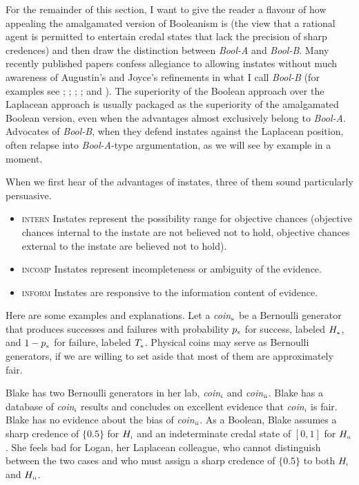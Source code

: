 \documentclass[11pt]{article}
\newcommand{\anderson}[0]{\textit{Bool-A}}
\newcommand{\augustin}[0]{\textit{Bool-B}}
\begin{document}
For the remainder of this section, I want to give the reader a flavour
of how appealing the amalgamated version of Booleanism is (the view
that a rational agent is permitted to entertain credal states that
lack the precision of sharp credences) and then draw the distinction
between {\anderson} and {\augustin}. Many recently published papers
confess allegiance to allowing instates without much awareness of
Augustin's and Joyce's refinements in what I call {\augustin} (for
examples see ; ;
; ; and
). The superiority of the Boolean approach over
the Laplacean approach is usually packaged as the superiority of the
amalgamated Boolean version, even when the advantages almost
exclusively belong to {\anderson}. Advocates of {\augustin}, when they
defend instates against the Laplacean position, often relapse into
{\anderson}-type argumentation, as we will see by example in a moment.

When we first hear of the advantages of instates, three of
them sound particularly persuasive.

\begin{itemize}
\item \textsc{intern} Instates represent the possibility range for
  objective chances (objective chances internal to the instate are not
  believed not to hold, objective chances external to the instate are
  believed not to hold).
\item \textsc{incomp} Instates represent incompleteness or
  ambiguity of the evidence.
\item \textsc{inform} Instates are responsive to the information
  content of evidence.
\end{itemize}

Here are some examples and explanations. Let a
\textit{coin}$_{\mbox{\tiny{x}}}$ be a Bernoulli generator that
produces successes and failures with probability $p_{\mbox{\tiny{x}}}$
for success, labeled $H_{\mbox{\tiny{x}}}$, and
$1-p_{\mbox{\tiny{x}}}$ for failure, labeled $T_{\mbox{\tiny{x}}}$.
Physical coins may serve as Bernoulli generators, if we are willing to
set aside that most of them are approximately fair.

\begin{quotex}
  \label{ex:range} Blake has two Bernoulli generators in
  her lab, \textit{coin}$_{\mbox{\tiny{i}}}$ and
  \textit{coin}$_{\mbox{\tiny{ii}}}$. Blake has a database of
  \textit{coin}$_{\mbox{\tiny{i}}}$ results and concludes on excellent
  evidence that \textit{coin}$_{\mbox{\tiny{i}}}$ is fair. Blake has no
  evidence about the bias of \textit{coin}$_{\mbox{\tiny{ii}}}$. As a
  Boolean, Blake assumes a sharp credence of $\{0.5\}$ for
  $H_{\mbox{\tiny{i}}}$ and an indeterminate credal state of $[0,1]$
  for $H_{\mbox{\tiny{ii}}}$. She feels bad for Logan, her Laplacean
  colleague, who cannot distinguish between the two cases and who must
  assign a sharp credence of $\{0.5\}$ to both $H_{\mbox{\tiny{i}}}$
  and $H_{\mbox{\tiny{ii}}}$.
\end{quotex}
\end{document}
